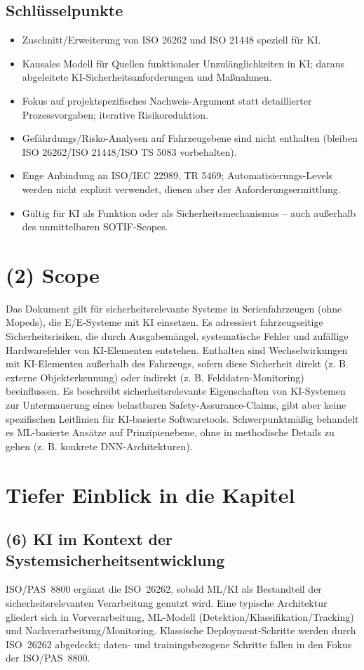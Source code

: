 \subsection*{Schlüsselpunkte}
\begin{itemize}
 \item Zuschnitt/Erweiterung von ISO 26262 und ISO 21448 speziell für KI.
 \item Kausales Modell für Quellen funktionaler Unzulänglichkeiten in KI; daraus abgeleitete KI-Sicherheitsanforderungen und Maßnahmen.
 \item Fokus auf projektspezifisches Nachweis-Argument statt detaillierter Prozessvorgaben; iterative Risikoreduktion.
 \item Gefährdungs/Risko-Analysen auf Fahrzeugebene sind nicht enthalten (bleiben ISO 26262/ISO 21448/ISO TS 5083 vorbehalten).
 \item Enge Anbindung an ISO/IEC 22989, TR 5469; Automatisierungs-Levels werden nicht explizit verwendet, dienen aber der Anforderungsermittlung.
 \item Gültig für KI als Funktion oder als Sicherheitsmechanismus – auch außerhalb des unmittelbaren SOTIF-Scopes.
\end{itemize}

\section{(2) Scope}
Das Dokument gilt für sicherheitsrelevante Systeme in Serienfahrzeugen (ohne Mopeds), 
die E/E-Systeme mit KI einsetzen. Es adressiert fahrzeugseitige Sicherheitsrisiken, die durch Ausgabemängel, 
systematische Fehler und zufällige Hardwarefehler von KI-Elementen entstehen. 
Enthalten sind Wechselwirkungen mit KI-Elementen außerhalb des Fahrzeugs, sofern diese Sicherheit direkt (z. B. 
externe Objekterkennung) oder indirekt (z. B. Felddaten-Monitoring) beeinflussen. Es beschreibt sicherheitsrelevante Eigenschaften 
von KI-Systemen zur Untermauerung eines belastbaren Safety-Assurance-Claims, gibt aber keine spezifischen Leitlinien 
für KI-basierte Softwaretools. Schwerpunktmäßig behandelt es ML-basierte Ansätze auf Prinzipienebene, ohne in methodische 
Details zu gehen (z. B. konkrete DNN-Architekturen).



\section{Tiefer Einblick in die Kapitel}
\subsection{(6) KI im Kontext der Systemsicherheitsentwicklung}
ISO/PAS~8800 ergänzt die ISO~26262, sobald ML/KI als Bestandteil der sicherheitsrelevanten 
Verarbeitung genutzt wird. Eine typische Architektur gliedert sich in Vorverarbeitung, 
ML-Modell (Detektion/Klassifikation/Tracking) und Nachverarbeitung/Monitoring. 
Klassische Deploy\-ment-Schritte  werden durch ISO~26262 abgedeckt; daten- und 
trainingsbezogene Schritte fallen in den Fokus der ISO/PAS~8800.

